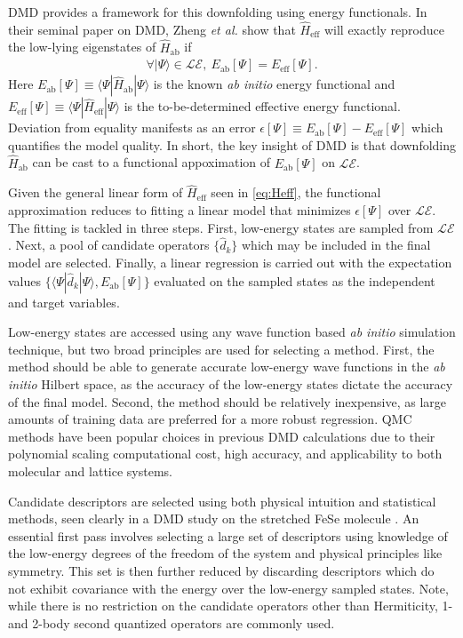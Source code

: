 \documentclass[12pt]{article}
\begin{document}
DMD provides a framework for this downfolding using energy functionals.
In their seminal paper on DMD, Zheng \textit{et al.} \cite{Zheng2017} show that $\hat{H}_\text{eff}$ will exactly reproduce the low-lying eigenstates of $\hat{H}_\text{ab}$ if
\begin{equation}
\begin{split}
\forall |\Psi\rangle \in \mathcal{LE},\ E_\text{ab}[\Psi] = E_\text{eff}[\Psi].
\end{split}
\label{eq:DMD}
\end{equation}
Here $E_\text{ab}[\Psi] \equiv \langle \Psi | \hat{H}_\text{ab} | \Psi \rangle$ is the known \textit{ab initio} energy functional and $E_\text{eff}[\Psi] \equiv \langle \Psi | \hat{H}_\text{eff} | \Psi \rangle$ is the to-be-determined effective energy functional.
Deviation from equality manifests as an error $\epsilon[\Psi] \equiv E_\text{ab}[\Psi] - E_\text{eff}[\Psi]$ which quantifies the model quality.
In short, the key insight of DMD is that downfolding $\hat{H}_\text{ab}$ can be cast to a functional appoximation of $E_\text{ab}[\Psi]$ on $\mathcal{LE}$.

Given the general linear form of $\hat{H}_\text{eff}$ seen in \eqref{eq:Heff}, 
the functional approximation reduces to fitting a linear model that minimizes $\epsilon[\Psi]$ over $\mathcal{LE}$.
The fitting is tackled in three steps.
First, low-energy states are sampled from $\mathcal{LE}$.
Next, a pool of candidate operators $\{\hat{d}_k\}$ which may be included in the final model are selected.
Finally, a linear regression is carried out with the expectation values $\{\langle \Psi | \hat{d}_k|\Psi \rangle, E_\text{ab}[\Psi] \}$  evaluated on the sampled states as the independent and target variables.

Low-energy states are accessed using any wave function based \textit{ab initio} simulation technique, but two broad principles are used for selecting a method.
First, the method should be able to generate accurate low-energy wave functions in the \textit{ab initio} Hilbert space, as the accuracy of the low-energy states dictate the accuracy of the final model.
Second, the method should be relatively inexpensive, as large amounts of training data are preferred for a more robust regression.
QMC methods have been popular choices in previous DMD calculations \cite{Zheng2017, Wagner2015} due to their polynomial scaling computational cost, high accuracy, and applicability to both molecular and lattice systems.

Candidate descriptors are selected using both physical intuition and statistical
methods, seen clearly in a DMD study on the stretched FeSe molecule \cite{Zheng2017}.
An essential first pass involves selecting a large set of descriptors using knowledge of the low-energy degrees of the freedom of the system and physical principles like symmetry.
This set is then further reduced by discarding descriptors which do not exhibit covariance with the energy over the low-energy sampled states.
Note, while there is no restriction on the candidate operators other than Hermiticity, 1- and 2-body second quantized operators are commonly used.
\end{document}
